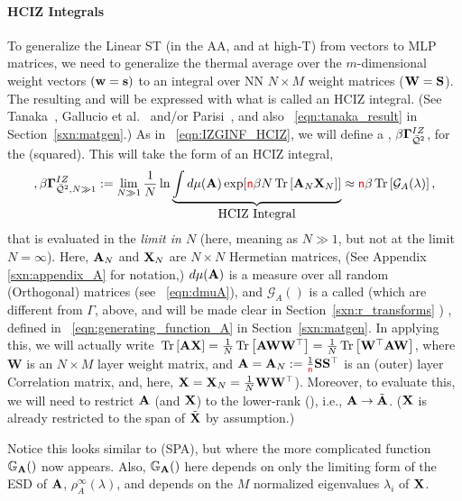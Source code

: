 \paragraph{HCIZ Integrals}
To generalize the Linear ST \Perceptron (in the AA, and at high-T) from \Perceptron vectors to MLP matrices,
we need to generalize the thermal average over the $m$-dimensional \Perceptron weight vectors $({\mathbf{w}}={\mathbf{s}})$
to an integral over NN \Student $N \times M$ weight matrices (${\mathbf{W}}=\mathbf{S}$).
The resulting \PartitionFunction and \FreeEnergy will be expressed with what is called an HCIZ integral.
(See Tanaka~\cite{Tanaka2007, Tanaka2008}, Gallucio et al.~\cite{Bouchaud1998} and/or Parisi~\cite{PP95}, and also \EQN~\ref{eqn:tanaka_result} in Section~\ref{sxn:matgen}.)
As in \EQN~\ref{eqn:IZGINF_HCIZ}, we will define a \emph{\LayerQuality \GeneratingFunction}, $\beta\mathbf{\Gamma}^{IZ}_{\bar{\mathcal{Q}}^{2}}$, for the \LayerQuality (squared).
This will take the form of an HCIZ integral,
\begin{align}
\label{eqn:hciz_prelim},
\beta\mathbf{\Gamma}^{IZ}_{\bar{\mathcal{Q}}^{2},N\gg 1} := \lim_{N\gg 1}\frac{1}{N}\ln \underbrace{\int d\mu(\mathbf{A}) \exp[{\color{red}\sf{n}}\beta N\mbox{}\operatorname{Tr}\left[\mathbf{A}_N\mathbf{X}_N\right]] }_{\mbox{HCIZ Integral}} 
  \approx {\color{red}\sf{n}}\beta\mbox{}\operatorname{Tr}\left[\mathcal{G}_{A}(\lambda)\right]  ,
\end{align}
that is evaluated in the \emph{\LargeN limit in $N$} (here, meaning as $N \gg 1$, but not at the limit $N=\infty$).
Here,  $\mathbf{A}_N$ and $\mathbf{X}_N$ are $N \times N$ Hermetian matrices, (See Appendix \ref{sxn:appendix_A} for notation,) $d\mu(\mathbf{A})$ is a measure
over all random (Orthogonal) matrices (see \EQN~\ref{eqn:dmuA}),
and $\mathcal{G}_{A}()$ is a called  \GEN 
(which are different from $\Gamma$, above, and will be made clear in Section~\ref{sxn:r_transforms} ) , defined in \EQN~\ref{eqn:generating_function_A} in Section~\ref{sxn:matgen}. 
In applying this, we will actually write $\mbox{}\operatorname{Tr}\left[\mathbf{A}\mathbf{X}\right]=\tfrac{1}{N}\mbox{}\operatorname{Tr}\left[\mathbf{A}{\mathbf{W}}{\mathbf{W}}^{\top}\right]=\tfrac{1}{N}\mbox{}\operatorname{Tr}\left[{\mathbf{W}}^{\top}\mathbf{A}{\mathbf{W}}\right]$,
where $\mathbf{W}$ is an $N \times M$ layer weight matrix, and $\mathbf{A}=\mathbf{A}_N:=\tfrac{1}{{\color{red}\sf{n}}}{\mathbf{S}}{\mathbf{S}}^{\top}$ is an (outer) layer
Correlation matrix, and, here,  $\mathbf{X}=\mathbf{X}_N=\tfrac{1}{N}{\mathbf{W}}{\mathbf{W}}^{\top}$).
Moreover, to evaluate this, we will need to restrict $\mathbf{A}$ (and $\mathbf{X}$)
to the lower-rank \EffectiveCorrelationSpace (\ECS),  i.e., $\mathbf{A}\rightarrow\tilde{\mathbf{A}}$. ($\mathbf{X}$ is already restricted to the span of $\tilde{\mathbf{X}}$ by \ECS assumption.)

Notice this looks similar to \SaddlePointApproximation (SPA), but where the more complicated function
$\mathbb{G}_{\mathbf{A}}()$ now appears.
Also, $\mathbb{G}_{\mathbf{A}}()$ here depends on only the limiting form of the ESD of $\mathbf{A}$, $\rho^{\infty}_{A}(\lambda)$,
and depends on the $M$ normalized eigenvalues $\lambda_{i}$ of $\mathbf{X}$.


